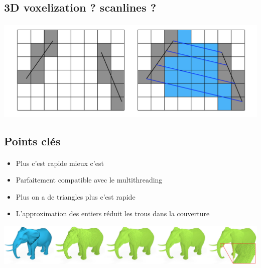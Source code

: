 \subsection{3D voxelization ? scanlines ?}

\begin{frame}[fragile=singleslide]{\insertsectionhead}
  \framesubtitle{\insertsubsectionhead}
  \begin{center}
      \includegraphics[scale=0.42]{resources/scanlines.png}
  \end{center}
\end{frame}

\subsection{Points clés}

\begin{frame}[fragile=singleslide]{\insertsectionhead}
  \framesubtitle{\insertsubsectionhead}
  \begin{itemize}
      \item Plus c'est rapide mieux c'est
      \item Parfaitement compatible avec le multithreading
      \item Plus on a de triangles plus c'est rapide
      \item L'approximation des entiers réduit les trous dans la couverture
    \end{itemize}
    \vspace{0.6cm}
    \begin{center}
        \includegraphics[scale=0.3]{resources/elephant.png}
    \end{center}
\end{frame}

